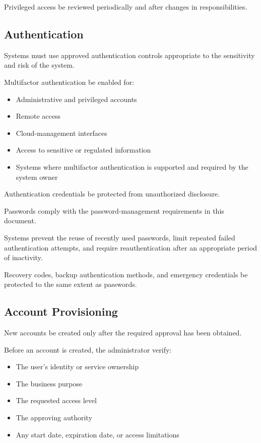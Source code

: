 Privileged access \must{} be reviewed periodically and after changes in responsibilities.

\subsection{Authentication}

Systems must use approved authentication controls appropriate to the sensitivity and risk of the system.

Multifactor authentication \must{} be enabled for:
\begin{itemize}
    \item Administrative and privileged accounts
    \item Remote access
    \item Cloud-management interfaces
    \item Access to sensitive or regulated information
    \item Systems where multifactor authentication is supported and required by the system owner
\end{itemize}

Authentication credentials \must{} be protected from unauthorized disclosure.

Passwords \must{} comply with the password-management requirements in this document.

Systems \should{} prevent the reuse of recently used passwords, limit repeated failed authentication attempts, and require reauthentication after an appropriate period of inactivity.

Recovery codes, backup authentication methods, and emergency credentials \must{} be protected to the same extent as passwords.

\subsection{Account Provisioning}

New accounts \must{} be created only after the required approval has been obtained.

Before an account is created, the administrator \should{} verify:
\begin{itemize}
    \item The user's identity or service ownership
    \item The business purpose
    \item The requested access level
    \item The approving authority
    \item Any start date, expiration date, or access limitations
\end{itemize}

